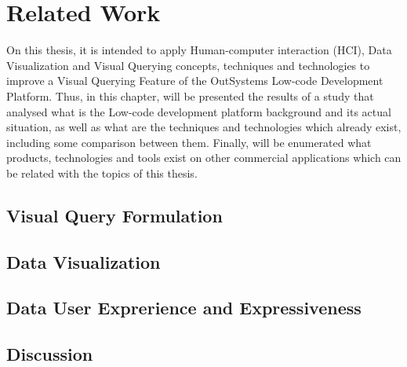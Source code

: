 \chapter{Related Work}
\label{cha:related_work}
On this thesis, it is intended to apply Human-computer interaction (HCI), Data Visualization and Visual Querying concepts, techniques and technologies to improve a Visual Querying Feature of the OutSystems Low-code Development Platform. Thus, in this chapter, will be presented the results of a study that analysed what is the Low-code development platform background and its actual situation, as well as what are the techniques and technologies which already exist, including some comparison between them. Finally, will be enumerated what products, technologies and tools exist on other commercial applications which can be related with the topics of this thesis.

\section{Visual Query Formulation}
\label{sec:visual_query_formulation}

\section{Data Visualization}
\label{sec:data_visualization}

\section{Data User Exprerience and Expressiveness}
\label{sec:data_user_experience_and_expressiveness}

\section{Discussion}
\label{sec:discussion}